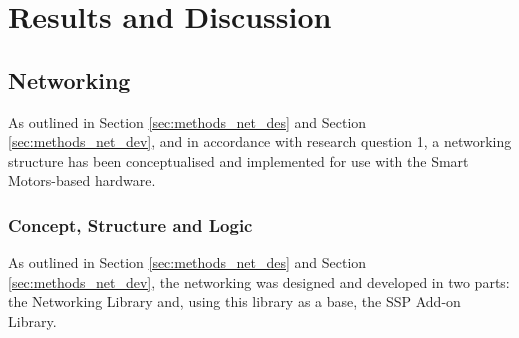 \cleardoublepage%
\chapter{\label{chap:res}Results and Discussion}%


\section{\label{sec:res_networking}Networking}%

As outlined in Section \ref{sec:methods_net_des} and Section \ref{sec:methods_net_dev}, and in accordance with research question 1, a networking structure has been conceptualised and implemented for use with the Smart Motors-based hardware.

\subsection{\label{sec:res_logic}Concept, Structure and Logic}

As outlined in Section \ref{sec:methods_net_des} and Section \ref{sec:methods_net_dev}, the networking was designed and developed in two parts: the Networking Library and, using this library as a base, the SSP Add-on Library. \\

